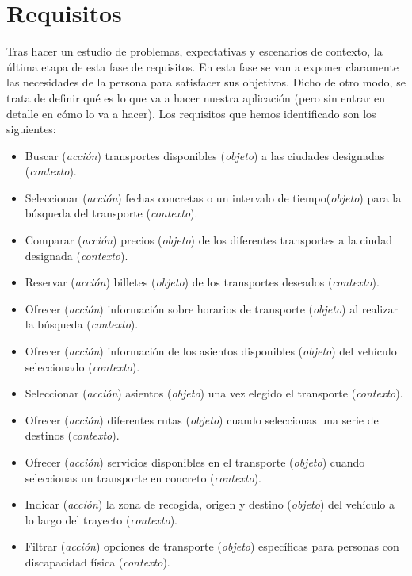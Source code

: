 \section{Requisitos}
Tras hacer un estudio de problemas, expectativas y escenarios de contexto, la última etapa de esta fase de requisitos. En esta fase se van a exponer claramente las 
necesidades de la persona para satisfacer sus objetivos. Dicho de otro modo, se trata de definir qué es lo que va a hacer nuestra aplicación (pero sin entrar en
detalle en cómo lo va a hacer). Los requisitos que hemos identificado son los siguientes:
\begin{itemize}
    \item Buscar (\textit{acción}) transportes disponibles (\textit{objeto}) a las ciudades designadas (\textit{contexto}).
    \item Seleccionar (\textit{acción}) fechas concretas o un intervalo de tiempo(\textit{objeto}) para la búsqueda del transporte (\textit{contexto}).
    \item Comparar (\textit{acción}) precios (\textit{objeto}) de los diferentes transportes a la ciudad designada (\textit{contexto}).
    \item Reservar (\textit{acción}) billetes (\textit{objeto}) de los transportes deseados (\textit{contexto}).
    \item Ofrecer (\textit{acción}) información sobre horarios de transporte (\textit{objeto}) al realizar la búsqueda (\textit{contexto}).
    \item Ofrecer (\textit{acción}) información de los asientos disponibles (\textit{objeto}) del vehículo seleccionado (\textit{contexto}).
    \item Seleccionar (\textit{acción}) asientos (\textit{objeto}) una vez elegido el transporte (\textit{contexto}).
    \item Ofrecer (\textit{acción}) diferentes rutas (\textit{objeto}) cuando seleccionas una serie de destinos (\textit{contexto}).
    \item Ofrecer (\textit{acción}) servicios disponibles en el transporte (\textit{objeto}) cuando seleccionas un transporte en concreto (\textit{contexto}).
    \item Indicar (\textit{acción}) la zona de recogida, origen y destino (\textit{objeto}) del vehículo a lo largo del trayecto (\textit{contexto}).
    \item Filtrar (\textit{acción}) opciones de transporte (\textit{objeto}) específicas para personas con discapacidad física (\textit{contexto}).

\end{itemize}
